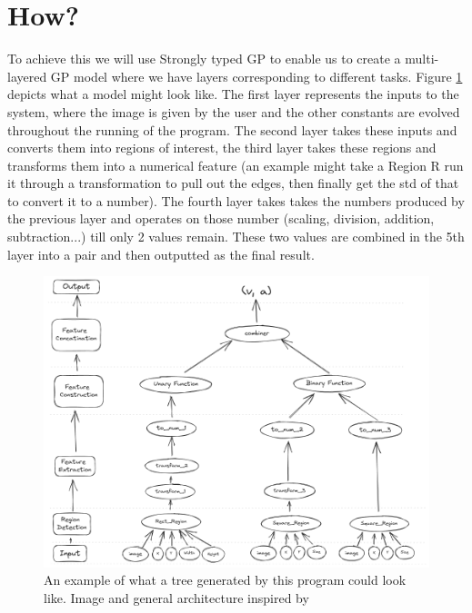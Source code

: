 \documentclass[7.5pt,twocolumn]{article}
\begin{document}
	\section{How?}
	To achieve this we will use Strongly typed GP to enable us to create a multi-layered GP model where we have layers corresponding to different tasks. Figure \ref{fig:examplemodel} depicts what a model might look like. The first layer represents the inputs to the system, where the image is given by the user and the other constants are evolved throughout the running of the program. The second layer takes these inputs and converts them into regions of interest, the third layer takes these regions and transforms them into a numerical feature (an example might take a Region R run it through a transformation to pull out the edges, then finally get the std of that to convert it to a number). The fourth layer takes takes the numbers produced by the previous layer and operates on those number (scaling, division, addition, subtraction...) till only 2 values remain. These two values are combined in the 5th layer into a pair and then outputted as the final result.
	\begin{figure}[H]
		\centering
		\includegraphics[width=\linewidth]{example_model}
		\caption{An example of what a tree generated by this program could look like. Image and general architecture inspired by\supercite{GPIC}}
		\label{fig:examplemodel}
	\end{figure}
	
\end{document}
